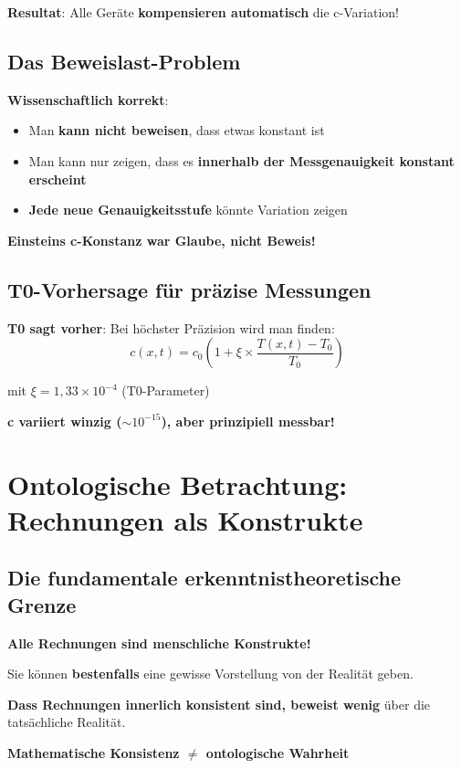 \documentclass[12pt,a4paper]{article}
\newcommand{\Tfield}{T}
\newcommand{\xipar}{\xi}
\begin{document}
	\textbf{Resultat}: Alle Geräte \textbf{kompensieren automatisch} die c-Variation!
	
	\subsection{Das Beweislast-Problem}
	
	\textbf{Wissenschaftlich korrekt}:
	\begin{itemize}
		\item Man \textbf{kann nicht beweisen}, dass etwas konstant ist
		\item Man kann nur zeigen, dass es \textbf{innerhalb der Messgenauigkeit konstant erscheint}
		\item \textbf{Jede neue Genauigkeitsstufe} könnte Variation zeigen
	\end{itemize}
	
	\textbf{Einsteins c-Konstanz war Glaube, nicht Beweis!}
	
	\subsection{T0-Vorhersage für präzise Messungen}
	
	\textbf{T0 sagt vorher}: Bei höchster Präzision wird man finden:
	\begin{equation}
		c(x,t) = c_0 \left(1 + \xipar \times \frac{\Tfield(x,t) - \Tfield_0}{\Tfield_0}\right)
	\end{equation}
	
	mit $\xipar = 1,33 \times 10^{-4}$ (T0-Parameter)
	
	\textbf{c variiert winzig ($\sim 10^{-15}$), aber prinzipiell messbar!}
	
	\section{Ontologische Betrachtung: Rechnungen als Konstrukte}
	
	\subsection{Die fundamentale erkenntnistheoretische Grenze}
	
	\begin{tcolorbox}[colback=purple!5!white,colframe=purple!75!black,title=Ontologische Wahrheit]
		\textbf{Alle Rechnungen sind menschliche Konstrukte!}
		
		Sie können \textbf{bestenfalls} eine gewisse Vorstellung von der Realität geben.
		
		\textbf{Dass Rechnungen innerlich konsistent sind, beweist wenig} über die tatsächliche Realität.
		
		\textbf{Mathematische Konsistenz $\neq$ ontologische Wahrheit}
	\end{tcolorbox}
	
\end{document}

